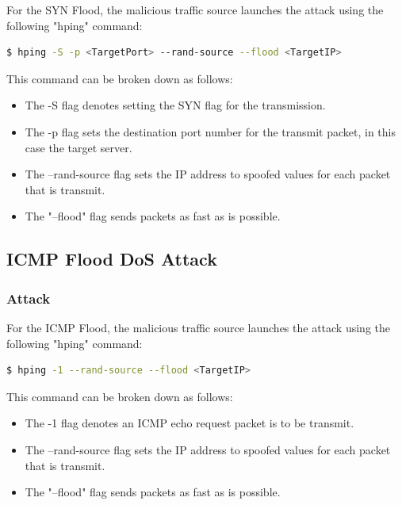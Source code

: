 For the SYN Flood, the malicious traffic source launches the attack using the
following "hping" command:

\begin{lstlisting}[language=bash, caption=SYN Flood DoS Command]
$ hping -S -p <TargetPort> --rand-source --flood <TargetIP>
\end{lstlisting}

This command can be broken down as follows:

\begin{itemize}
	\item The -S flag denotes setting the SYN flag for the transmission.
	\item The -p flag sets the destination port number for the transmit
		packet, in this case the target server.
	\item The --rand-source flag sets the IP address to spoofed values for
		each packet that is transmit.
	\item The "--flood" flag sends packets as fast as is possible.

\end{itemize}

\subsection {ICMP Flood DoS Attack}

\subsubsection{Attack}

For the ICMP Flood, the malicious traffic source launches the attack using the
following "hping" command:

\begin{lstlisting}[language=bash, caption=ICMP Flood DoS Command]
$ hping -1 --rand-source --flood <TargetIP>
\end{lstlisting}

This command can be broken down as follows:

\begin{itemize}
	\item The -1 flag denotes an ICMP echo request packet is to be transmit.
	\item The --rand-source flag sets the IP address to spoofed values for
		each packet that is transmit.
	\item The "--flood" flag sends packets as fast as is possible.
\end{itemize}

